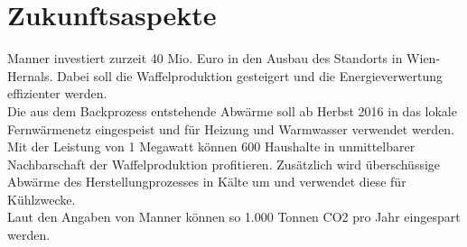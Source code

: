 \section{Zukunftsaspekte}
Manner investiert zurzeit 40 Mio. Euro in den Ausbau des Standorts in Wien-Hernals. Dabei soll die Waffelproduktion gesteigert und die Energieverwertung effizienter werden.\\
Die aus dem Backprozess entstehende Abwärme soll ab Herbst 2016 in das lokale Fernwärmenetz eingespeist und für Heizung und Warmwasser verwendet werden. Mit der Leistung von 1 Megawatt können 600 Haushalte in unmittelbarer Nachbarschaft der Waffelproduktion profitieren. Zusätzlich wird überschüssige Abwärme des Herstellungprozesses in Kälte um und verwendet diese für Kühlzwecke.\\
Laut den Angaben von Manner können so 1.000 Tonnen CO2 pro Jahr eingespart werden. \cite{wienat_waerme}